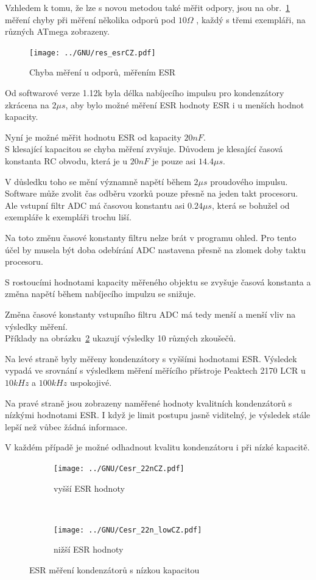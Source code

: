 Vzhledem k tomu, že lze s novou metodou také měřit odpory, jsou na obr.~\ref{fig:res_esr} měření chyby při měření několika odporů pod \(10\Omega\) , každý s třemi exempláři, na různých ATmega zobrazeny.  

\begin{figure}[H]
\centering
\texttt{[image: ../GNU/res\_esrCZ.pdf]}
\caption{Chyba měření u odporů, měřením ESR}
\label{fig:res_esr}
\end{figure}

Od softwarové verze 1.12k byla délka nabíjecího impulsu pro kondenzátory zkrácena na \(2\mu s\), aby bylo možné měření ESR hodnoty ESR i u menších hodnot kapacity.

Nyní je možné měřit hodnotu ESR od kapacity \(20nF\).\\
S klesající kapacitou se chyba měření zvyšuje. Důvodem je klesající časová konstanta RC obvodu, která je u \(20nF\) je pouze asi \(14.4\mu s\).

V důsledku toho se mění významně napětí během \(2\mu s\) proudového impulsu.\\
Software může zvolit čas odběru vzorků pouze přesně na jeden takt procesoru. Ale vstupní filtr
ADC má časovou konstantu asi \(0.24\mu s\), která se bohužel od exempláře k exempláři trochu liší.

Na toto změnu časové konstanty filtru nelze brát v programu ohled.
Pro tento účel by musela být doba odebírání ADC nastavena přesně na zlomek doby taktu procesoru.

S rostoucími hodnotami kapacity měřeného objektu se zvyšuje časová konstanta a změna napětí během nabíjecího impulzu se snižuje.

Změna časové konstanty vstupního filtru ADC má tedy menší a menší vliv na výsledky měření.\\
Příklady na obrázku~\ref{pic:Cesr_22n} ukazují výsledky 10 různých zkoušečů.

Na levé straně byly měřeny kondenzátory s vyššími hodnotami ESR. Výsledek vypadá ve srovnání s výsledkem měření měřícího přístroje Peaktech 2170 LCR u \(10kHz\) a \(100kHz\) uspokojivé.

Na pravé straně jsou zobrazeny naměřené hodnoty kvalitních kondenzátorů s nízkými hodnotami ESR.
I když je limit postupu jasně viditelný, je výsledek stále lepší než vůbec žádná informace.

V každém případě je možné odhadnout kvalitu kondenzátoru i při nízké kapacitě.

\begin{figure}[H]
  \begin{subfigure}[b]{9cm}
    \centering
    \texttt{[image: ../GNU/Cesr\_22nCZ.pdf]}
    \caption{vyšší ESR hodnoty}
  \end{subfigure}
  ~
  \begin{subfigure}[b]{9cm}
    \centering
    \texttt{[image: ../GNU/Cesr\_22n\_lowCZ.pdf]}
    \caption{nižší ESR hodnoty}
  \end{subfigure}
  \caption{ESR měření kondenzátorů s nízkou kapacitou}
  \label{pic:Cesr_22n}
\end{figure}
 
